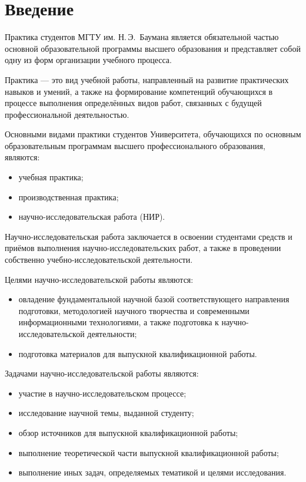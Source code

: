\documentclass[12pt,a4paper]{article}
\begin{document}
\setcounter{page}{2}
\tableofcontents
\newpage
\section*{Введение}

Практика студентов МГТУ им. Н.\,Э.~Баумана является обязательной частью основной образовательной программы
высшего образования и представляет собой одну из форм организации учебного процесса.

Практика — это вид учебной работы, направленный на развитие практических навыков и умений,
а также на формирование компетенций обучающихся в процессе выполнения определённых видов работ,
связанных с будущей профессиональной деятельностью.

Основными видами практики студентов Университета, обучающихся по основным образовательным программам
высшего профессионального образования, являются:
\begin{itemize}[label=--]
  \item учебная практика;
  \item производственная практика;
  \item научно-исследовательская работа (НИР).
\end{itemize}

Научно-исследовательская работа заключается в освоении студентами средств и приёмов выполнения
научно-исследовательских работ, а также в проведении собственно учебно-исследовательской деятельности.

Целями научно-исследовательской работы являются:
\begin{itemize}[label=--]
  \item овладение фундаментальной научной базой соответствующего направления подготовки,
  методологией научного творчества и современными информационными технологиями, а также подготовка
  к научно-исследовательской деятельности;
  \item подготовка материалов для выпускной квалификационной работы.
\end{itemize}

Задачами научно-исследовательской работы являются:
\begin{itemize}[label=--]
  \item участие в научно-исследовательском процессе;
  \item исследование научной темы, выданной студенту;
  \item обзор источников для выпускной квалификационной работы;
  \item выполнение теоретической части выпускной квалификационной работы;
  \item выполнение иных задач, определяемых тематикой и целями исследования.
\end{itemize}
\end{document}
